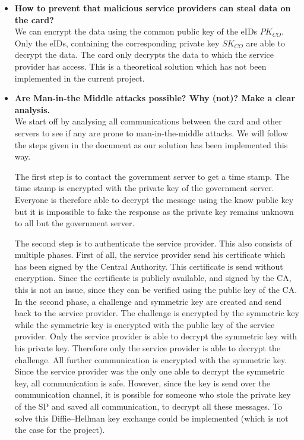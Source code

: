 \documentclass[12pt]{report}
\begin{document}
\begin{itemize}
\item \textbf{How to prevent that malicious service providers can steal data on the card?}\\
We can encrypt the data using the common public key of the eIDs $PK_{CO}$. Only the eIDs, containing the corresponding private key $SK_{CO}$ are able to decrypt the data. The card only decrypts the data to which the service provider has access. This is a theoretical solution which has not been implemented in the current project.

\item \textbf{Are Man-in-the Middle attacks possible? Why (not)? Make a clear analysis.}\\
We start off by analysing all communications between the card and other servers to see if any are prone to man-in-the-middle attacks. We will follow the steps given in the document as our solution has been implemented this way.

The first step is to contact the government server to get a time stamp. The time stamp is encrypted with the private key of the government server. Everyone is therefore able to decrypt the message using the know public key but it is impossible to fake the response as the private key remains unknown to all but the government server.

The second step is to authenticate the service provider. This also consists of multiple phases. First of all, the service provider send his certificate which has been signed by the Central Authority. This certificate is send without encryption. Since the certificate is publicly available, and signed by the CA, this is not an issue, since they can be verified using the public key of the CA.
In the second phase, a challenge and symmetric key are created and send back to the service provider. The challenge is encrypted by the symmetric key while the symmetric key is encrypted with the public key of the service provider. Only the service provider is able to decrypt the symmetric key with his private key. Therefore only the service provider is able to decrypt the challenge. All further communication is encrypted with the symmetric key. Since the service provider was the only one able to decrypt the symmetric key, all communication is safe. However, since the key is send over the communication channel, it is possible for someone who stole the private key of the SP and saved all communication, to decrypt all these messages. To solve this Diffie–Hellman key exchange could be implemented (which is not the case for the project).


\end{itemize}
\end{document}
